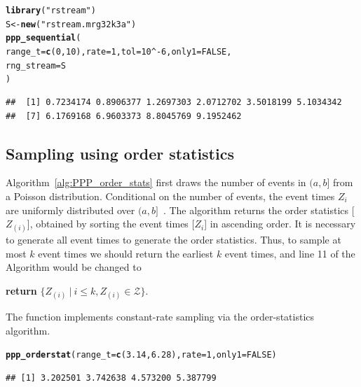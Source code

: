 \documentclass[article,nojss]{jss}\usepackage[]{graphicx}\usepackage[]{xcolor}
\makeatletter
\newcommand{\hlnum}[1]{\textcolor[rgb]{0.686,0.059,0.569}{#1}}%
\newcommand{\hlstr}[1]{\textcolor[rgb]{0.192,0.494,0.8}{#1}}%
\newcommand{\hlopt}[1]{\textcolor[rgb]{0,0,0}{#1}}%
\newcommand{\hlstd}[1]{\textcolor[rgb]{0.345,0.345,0.345}{#1}}%
\newcommand{\hlkwb}[1]{\textcolor[rgb]{0.69,0.353,0.396}{#1}}%
\newcommand{\hlkwc}[1]{\textcolor[rgb]{0.333,0.667,0.333}{#1}}%
\newcommand{\hlkwd}[1]{\textcolor[rgb]{0.737,0.353,0.396}{\textbf{#1}}}%
\newenvironment{kframe}{%
 \def\at@end@of@kframe{}%
 \ifinner\ifhmode%
  \def\at@end@of@kframe{\end{minipage}}%
  \begin{minipage}{\columnwidth}%
 \fi\fi%
 \def\FrameCommand##1{\hskip\@totalleftmargin \hskip-\fboxsep
 \colorbox{shadecolor}{##1}\hskip-\fboxsep
     \hskip-\linewidth \hskip-\@totalleftmargin \hskip\columnwidth}%
 \MakeFramed {\advance\hsize-\width
   \@totalleftmargin\z@ \linewidth\hsize
   \@setminipage}}%
 {\par\unskip\endMakeFramed%
 \at@end@of@kframe}
\newenvironment{knitrout}{}{} %
\newcommand{\fct}[1]{\code{#1()}}
\makeatother
\begin{document}
\begin{knitrout}
\color{fgcolor}\begin{kframe}
\begin{alltt}
\hlkwd{library}\hlstd{(}\hlstr{"rstream"}\hlstd{)}
\hlstd{S} \hlkwb{<-} \hlkwd{new}\hlstd{(}\hlstr{"rstream.mrg32k3a"}\hlstd{)}
\hlkwd{ppp_sequential}\hlstd{(}
  \hlkwc{range_t} \hlstd{=} \hlkwd{c}\hlstd{(}\hlnum{0}\hlstd{,} \hlnum{10}\hlstd{),} \hlkwc{rate} \hlstd{=} \hlnum{1}\hlstd{,} \hlkwc{tol} \hlstd{=} \hlnum{10}\hlopt{^-}\hlnum{6}\hlstd{,} \hlkwc{only1} \hlstd{=} \hlnum{FALSE}\hlstd{,}
  \hlkwc{rng_stream} \hlstd{= S}
\hlstd{)}
\end{alltt}
\begin{verbatim}
##  [1] 0.7234174 0.8906377 1.2697303 2.0712702 3.5018199 5.1034342
##  [7] 6.1769168 6.9603373 8.8045769 9.1952462
\end{verbatim}
\end{kframe}
\end{knitrout}


\subsection{Sampling using order statistics}\label{sec:PPP_order_stats}


Algorithm~\ref{alg:PPP_order_stats} first draws the number of events in $(a, b]$ from a Poisson distribution. Conditional on the number of events, the event times $Z_i$ are uniformly distributed over $(a, b]$~\citep[par. 4.1]{cox1965theory}. The algorithm returns the order statistics [$Z_{(i)}$], obtained by sorting the event times [$Z_i$] in ascending order. It is necessary to generate all event times to generate the order statistics. Thus, to sample at most $k$ event times we should return the earliest $k$ event times, and line 11 of the Algorithm would be changed to
\begin{center}
\textbf{return} {$\{Z_{(i)} \ | \ i \le k, Z_{(i)} \in \mathcal{Z}\}$}.
\end{center}


The \fct{ppp\_orderstat} function implements constant-rate sampling via the order-statistics algorithm.

\begin{knitrout}
\color{fgcolor}\begin{kframe}
\begin{alltt}
\hlkwd{ppp_orderstat}\hlstd{(}\hlkwc{range_t} \hlstd{=} \hlkwd{c}\hlstd{(}\hlnum{3.14}\hlstd{,} \hlnum{6.28}\hlstd{),} \hlkwc{rate} \hlstd{=} \hlnum{1}\hlstd{,} \hlkwc{only1} \hlstd{=} \hlnum{FALSE}\hlstd{)}
\end{alltt}
\begin{verbatim}
## [1] 3.202501 3.742638 4.573200 5.387799
\end{verbatim}
\end{kframe}
\end{knitrout}
\end{document}
